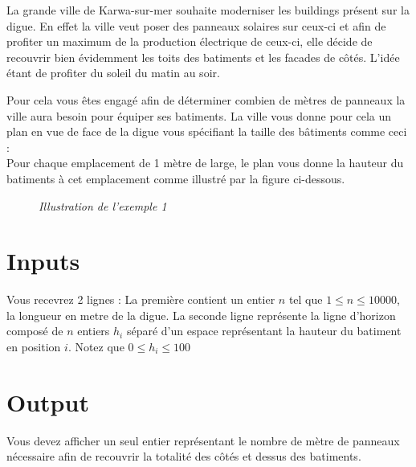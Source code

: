 \problemname{\problemyamlname}
\usepackage{tikz}
La grande ville de Karwa-sur-mer souhaite moderniser les buildings présent sur la digue. En effet la ville veut poser des panneaux solaires sur ceux-ci et afin de profiter un maximum de la production électrique de ceux-ci, elle décide de recouvrir bien évidemment les toits des batiments et les facades de côtés. L'idée étant de profiter du soleil du matin au soir.


Pour cela vous êtes engagé afin de déterminer combien de mètres de panneaux la ville aura besoin pour équiper ses batiments. La ville vous donne pour cela un plan en vue de face de la digue vous spécifiant la taille des bâtiments comme ceci : \\

Pour chaque emplacement de 1 mètre de large, le plan vous donne la hauteur du batiments à cet emplacement comme illustré par la figure ci-dessous.

\begin{figure}[h]
\centering
{}
\newline
\textit{Illustration de l'exemple 1}
\end{figure}


\section*{Inputs}
Vous recevrez 2 lignes :
La première contient un entier $n$ tel que $1 \leq n \leq 10 000$, la longueur en metre de la digue.
La seconde ligne représente la ligne d'horizon composé de $n$ entiers $h_{i}$ séparé d'un espace représentant la hauteur du batiment en position $i$. Notez que $0 \leq h_{i} \leq 100$

\section*{Output}
Vous devez afficher un seul entier représentant le nombre de mètre de panneaux nécessaire afin de recouvrir la totalité des côtés et dessus des batiments.

